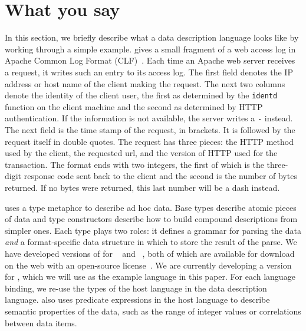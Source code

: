 \documentclass{sig-alternate}
\begin{document}
\section{What you say}
\label{sec:language}



In this section, we briefly describe what a \pads{} data description
language looks like by working through a simple example. 
 gives a small fragment of a web access log in Apache
Common Log Format (CLF)~\cite{apacheclf}.  Each time an Apache web server
receives a request, it writes such an entry to its access log.  The
first field denotes the IP address or host name of the client making
the request.  The next two columns denote the identity of the client
user, the first as determined by the \texttt{identd} function on the
client machine and the second as determined by HTTP authentication.
If the information is not available, the server writes a \texttt{-}
instead. The next field is the time stamp of the request, in brackets.
It is followed by the request itself in double quotes. The request has
three pieces: the HTTP method used by the client, the requested url,
and the version of HTTP used for the transaction.  The format ends
with two integers, the first of which is the three-digit response code
sent back to the client and the second is the number of bytes
returned.  If no bytes were returned, this last number will be a dash
instead.  

\pads{} uses a type metaphor to describe ad hoc data.  Base types
describe atomic pieces of data and type constructors describe how to
build compound descriptions from simpler ones.  Each \pads{} type
plays two roles: it defines a grammar for parsing the data
\textit{and} a format-specific data structure in which to store the
result of the parse.  We have developed versions of \pads{} for
\C{}~\cite{fisher+:pads} and \ml{}~\cite{mandelbaum+:pads-ml}, both of
which are available for download on the web with an open-source
license~\cite{padsweb}. We are currently developing a version for
\haskell{}, which we will use as the example language in this paper.
For each language binding, we re-use the types of the host language in
the data description language.  \pads{} also uses predicate expressions
in the host language to describe semantic properties of the data, such
as the range of integer values or correlations between data items.
\end{document}
